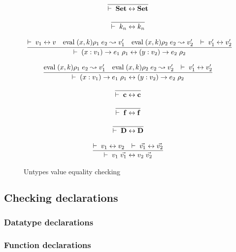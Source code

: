 \begin{figure}
\caption{Untypes value equality checking}

\[\begin{array}{c}
	  \infer{\EqVal{\Set}{\Set}}
          {}
\end{array}\]

\[\begin{array}{c}
	  \infer{\EqVal{k_n}{k_n}}
          {}
\end{array}\]

\[\begin{array}{c}
	  \infer{\EqVal{\VPi{x}{v_1}{e_1}{\rho_1}}{\VPi{y}{v_2}{e_2}{\rho_2}}}
          {   \EqVal{v_1}{v} 
& \Eval{(x,k)\rho_1}{e_2}{v'_1}
& \Eval{(x,k)\rho_2}{e_2}{v'_2}
& \EqVal{v'_1}{v'_2}}
\end{array}\]

\[\begin{array}{c}
	  \infer{\EqVal{\VPi{x}{v_1}{e_1}{\rho_1}}{\VPi{y}{v_2}{e_2}{\rho_2}}}
          {
\Eval{(x,k)\rho_1}{e_2}{v'_1}
& \Eval{(x,k)\rho_2}{e_2}{v'_2}
& \EqVal{v'_1}{v'_2}}
\end{array}\]

\[\begin{array}{c}
	  \infer{\EqVal{\cc}{\cc}}
          {}
\end{array}\]

\[\begin{array}{c}
	  \infer{\EqVal{\ff}{\ff}}
          {}
\end{array}\]

\[\begin{array}{c}
	  \infer{\EqVal{\DD}{\DD}}
          {}
\end{array}\]


\[\begin{array}{c}
	  \infer{\EqVal{v_1 \; \vec{v_1}}{v_2 \; \vec{v_2}}}
          {\EqVal{v_1}{v_2} & \EqVal{\vec{v_1}}{\vec{v_2}}}
\end{array}\]


\end{figure}

\subsection{Checking declarations}
\subsubsection{Datatype declarations}
\subsubsection{Function declarations}

